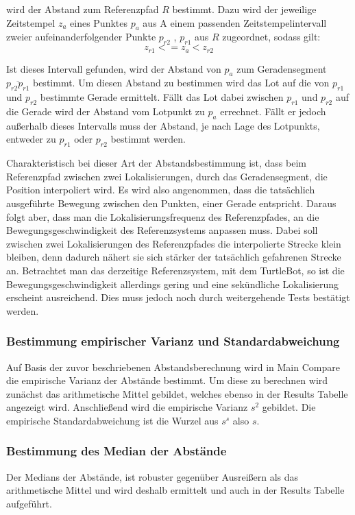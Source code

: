 wird der Abstand zum Referenzpfad $R$ bestimmt. Dazu wird der jeweilige
Zeitstempel $z_a$ eines Punktes $p_a$ aus A einem passenden
Zeitstempelintervall zweier aufeinanderfolgender Punkte $p_{r2}$ , $p_{r1}$ aus $R$ zugeordnet, sodass
gilt:
\[
z_{r1} <= z_a < z_{r2}
\]

Ist dieses Intervall gefunden, wird der Abstand von $p_a$ zum Geradensegment
$\overline{p_{r2} p_{r1}}$ bestimmt. Um diesen Abstand zu bestimmen wird das
Lot auf die von $p_{r1}$ und $p_{r2}$ bestimmte Gerade ermittelt. Fällt das Lot
dabei zwischen $p_{r1}$ und $p_{r2}$ auf die Gerade wird der Abstand vom
Lotpunkt zu $p_a$ errechnet. Fällt er jedoch außerhalb dieses Intervalls muss
der Abstand, je nach Lage des Lotpunkts, entweder zu $p_{r1}$ oder $p_{r2}$
bestimmt werden. 

Charakteristisch bei dieser Art der Abstandsbestimmung ist, dass beim
Referenzpfad zwischen zwei Lokalisierungen, durch das Geradensegment, die
Position interpoliert wird. Es wird also angenommen, dass die tatsächlich
ausgeführte Bewegung zwischen den Punkten, einer Gerade entspricht. Daraus
folgt aber, dass man die Lokalisierungsfrequenz des Referenzpfades, an die
Bewegungsgeschwindigkeit des Referenzsystems anpassen muss. Dabei soll
zwischen zwei Lokalisierungen des Referenzpfades die interpolierte Strecke
klein bleiben, denn dadurch nähert sie sich stärker der tatsächlich gefahrenen
Strecke an. Betrachtet man das derzeitige Referenzsystem, mit dem TurtleBot, so
ist die Bewegungsgeschwindigkeit allerdings gering und eine sekündliche
Lokalisierung erscheint ausreichend. Dies muss jedoch noch durch weitergehende
Tests bestätigt werden.


\subsubsection{Bestimmung empirischer Varianz und Standardabweichung}
Auf Basis der zuvor beschriebenen Abstandsberechnung wird in Main Compare die
empirische Varianz der Abstände bestimmt. Um diese zu berechnen wird zunächst
das arithmetische Mittel gebildet, welches ebenso in der Results Tabelle angezeigt wird.
Anschließend wird die empirische Varianz $s^2$ gebildet. Die empirische Standardabweichung
ist die Wurzel aus $s^s$ also $s$.

\subsubsection{Bestimmung des Median der Abstände}
Der Medians der Abstände, ist robuster gegenüber Ausreißern als das
arithmetische Mittel und wird deshalb ermittelt und auch in der Results Tabelle
aufgeführt.

